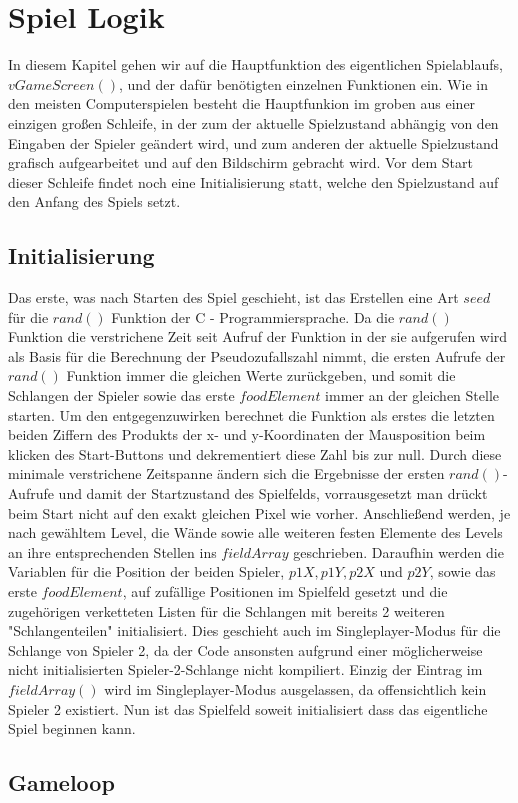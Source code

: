 
\chapter{Spiel Logik}
\label{Spiel_Logik}
%
In diesem Kapitel gehen wir auf die Hauptfunktion des eigentlichen Spielablaufs, $vGameScreen()$, und der daf{\"u}r ben{\"o}tigten einzelnen Funktionen ein. Wie in den meisten Computerspielen besteht die Hauptfunkion im groben aus einer einzigen gro{\ss}en Schleife, in der zum der aktuelle Spielzustand abh{\"a}ngig von den Eingaben der Spieler ge{\"a}ndert wird, und zum anderen der aktuelle Spielzustand grafisch aufgearbeitet und auf den Bildschirm gebracht wird. Vor dem Start dieser Schleife findet noch eine Initialisierung statt, welche den Spielzustand auf den Anfang des Spiels setzt.
%

\section{Initialisierung}
\label{Initialisierung}
%
Das erste, was nach Starten des Spiel geschieht, ist das Erstellen eine Art $seed$ f{\"u}r die $rand()$ Funktion der C - Programmiersprache. Da die $rand()$ Funktion die verstrichene Zeit seit Aufruf der Funktion in der sie aufgerufen wird als Basis f{\"u}r die Berechnung der Pseudozufallszahl nimmt, die ersten Aufrufe der $rand()$ Funktion immer die gleichen Werte zur{\"u}ckgeben, und somit die Schlangen der Spieler sowie das erste $foodElement$ immer an der gleichen Stelle starten. Um den entgegenzuwirken berechnet die Funktion als erstes die letzten beiden Ziffern des Produkts der x- und y-Koordinaten der Mausposition beim klicken des Start-Buttons und dekrementiert diese Zahl bis zur null. Durch diese minimale verstrichene Zeitspanne {\"a}ndern sich die Ergebnisse der ersten $rand()$-Aufrufe und damit der Startzustand des Spielfelds, vorrausgesetzt man dr{\"u}ckt beim Start nicht auf den exakt gleichen Pixel wie vorher.
Anschlie{\ss}end werden, je nach gew{\"a}hltem Level, die W{\"a}nde sowie alle weiteren festen Elemente des Levels an ihre entsprechenden Stellen ins $fieldArray$ geschrieben.
Daraufhin werden die Variablen f{\"u}r die Position der beiden Spieler, $p1X, p1Y, p2X$ und $p2Y$, sowie das erste $foodElement$, auf zuf{\"a}llige Positionen im Spielfeld gesetzt und die zugeh{\"o}rigen verketteten Listen f{\"u}r die Schlangen mit bereits 2 weiteren "Schlangenteilen" initialisiert. Dies geschieht auch im Singleplayer-Modus f{\"u}r die Schlange von Spieler 2, da der Code ansonsten aufgrund einer m{\"o}glicherweise nicht initialisierten Spieler-2-Schlange nicht kompiliert. Einzig der Eintrag im $fieldArray()$  wird im Singleplayer-Modus ausgelassen, da offensichtlich kein Spieler 2 existiert.
Nun ist das Spielfeld soweit initialisiert dass das eigentliche Spiel beginnen kann.
%

\section{Gameloop}
\label{Gameloop}
%

%


   

%
